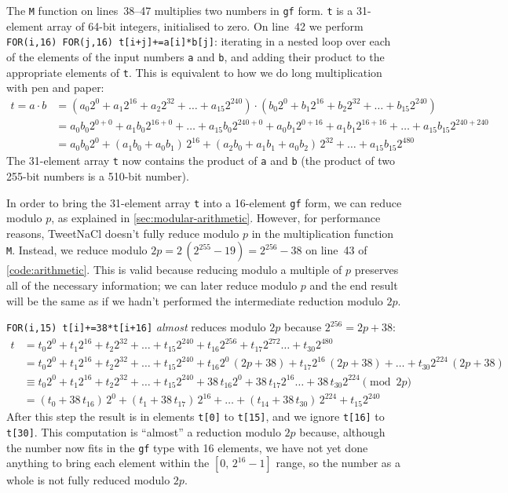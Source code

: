 \documentclass{article}
\begin{document}
The \verb|M| function on lines~38--47 multiplies two numbers in \verb|gf| form.
\verb|t| is a 31-element array of 64-bit integers, initialised to zero.
On line~42 we perform \verb|FOR(i,16) FOR(j,16) t[i+j]+=a[i]*b[j]|: iterating in a nested loop over each of the elements of the input numbers \verb|a| and \verb|b|, and adding their product to the appropriate elements of \verb|t|.
This is equivalent to how we do long multiplication with pen and paper:
\begin{align}
    t = a \cdot b &= (a_0 2^0 + a_1 2^{16} + a_2 2^{32} + \dots + a_{15} 2^{240}) \cdot (b_0 2^0 + b_1 2^{16} + b_2 2^{32} + \dots + b_{15} 2^{240}) \nonumber\\
    &= a_0 b_0 2^{0+0} + a_1 b_0 2^{16+0} + \dots + a_{15} b_0 2^{240+0} + a_0 b_1 2^{0+16} + a_1 b_1 2^{16+16} + \dots + a_{15} b_{15} 2^{240+240} \nonumber\\
    &= a_0 b_0 2^0 + (a_1 b_0 + a_0 b_1)\, 2^{16} + (a_2 b_0 + a_1 b_1 + a_0 b_2)\, 2^{32} + \dots + a_{15} b_{15} 2^{480} \label{eq:multiplication}
\end{align}
The 31-element array \verb|t| now contains the product of \verb|a| and \verb|b| (the product of two 255-bit numbers is a 510-bit number).

In order to bring the 31-element array \verb|t| into a 16-element \verb|gf| form, we can reduce modulo $p$, as explained in \autoref{sec:modular-arithmetic}.
However, for performance reasons, TweetNaCl doesn't fully reduce modulo $p$ in the multiplication function \verb|M|.
Instead, we reduce modulo $2p = 2\,(2^{255} - 19) = 2^{256} - 38$ on line~43 of \autoref{code:arithmetic}.
This is valid because reducing modulo a multiple of $p$ preserves all of the necessary information; we can later reduce modulo $p$ and the end result will be the same as if we hadn't performed the intermediate reduction modulo $2p$.

\verb|FOR(i,15) t[i]+=38*t[i+16]| \emph{almost} reduces modulo $2p$ because $2^{256} = 2p + 38$:
\begin{align}
    t &= t_0 2^0 + t_1 2^{16} + t_2 2^{32} + \dots + t_{15} 2^{240} + t_{16} 2^{256} + t_{17} 2^{272} \dots + t_{30} 2^{480} \nonumber\\
    &= t_0 2^0 + t_1 2^{16} + t_2 2^{32} + \dots + t_{15} 2^{240} + t_{16} 2^0\, (2p + 38) + t_{17} 2^{16}\, (2p + 38) + \dots + t_{30} 2^{224}\, (2p + 38) \nonumber\\
    &\equiv t_0 2^0 + t_1 2^{16} + t_2 2^{32} + \dots + t_{15} 2^{240} + 38\, t_{16} 2^0 + 38\, t_{17} 2^{16} \dots + 38\, t_{30} 2^{224} \pmod{2p} \nonumber\\
    &= (t_0 + 38\, t_{16})\, 2^0 + (t_1 + 38\, t_{17})\, 2^{16} + \dots + (t_{14} + 38\, t_{30})\, 2^{224} + t_{15} 2^{240} \label{eq:reduce-2p}
\end{align}
After this step the result is in elements \verb|t[0]| to \verb|t[15]|, and we ignore \verb|t[16]| to \verb|t[30]|.
This computation is ``almost'' a reduction modulo $2p$ because, although the number now fits in the \verb|gf| type with 16 elements, we have not yet done anything to bring each element within the $[0,\, 2^{16}-1]$ range, so the number as a whole is not fully reduced modulo $2p$.
\end{document}
